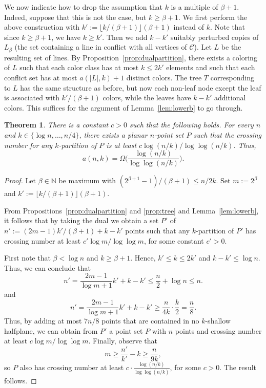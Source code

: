 \documentclass{paper}
\newcommand\N{{\mathbb N}}
\newcommand\eqdef{:=}
\newtheorem {theorem} {Theorem}[section]
\begin{document}
We now indicate how to drop the assumption that $k$ is a multiple
of $\beta + 1$. Indeed, suppose that this is not the case,
but $k \geq \beta + 1$.  We first perform the
above construction with $k' \eqdef \lfloor k/(\beta + 1) \rfloor (\beta + 1)$ 
instead of $k$. Note that since $k \geq \beta+1$, we have $k \geq k'$. 
Then we add $k-k'$ suitably perturbed copies of $L_\beta$ 
(the set containing a line in conflict with all vertices of $\mathcal{C}$).
Let $L$ be the resulting set of lines. By Proposition~\ref{prop:dualpartition},
there exists a coloring of $L$ such that each color class has at most
$k \leq 2k'$ elements and such that each conflict set has at most
$a(|L|, k)+1$ distinct colors. The tree $T$ corresponding to $L$
has the same structure as before, but now each non-leaf node except
the leaf is associated with $k'/(\beta + 1)$ colors, while the leaves
have $k - k'$ additional colors. 
This suffices for the argument of Lemma~\ref{lem:lowerb} to go through.

\begin{theorem}
There is a constant $c > 0$ such that the following holds. For every $n$
and $k \in \{\log n, \ldots, n/4\}$, there 
exists a planar $n$-point set $P$
such that the crossing number for any $k$-partition of $P$ is at least
$c\log (n/k) / \log\log (n/k)$. Thus,
\[a(n,k) = \Omega\Biggl(\frac{\log (n/k)}{\log\log (n/k)}\Biggr).\]
\end{theorem}

\begin{proof}
Let $\beta \in \N$ be maximum with $(2^{\beta+1}-1)/(\beta+1) \leq n/2k$. 
Set $m \eqdef 2^\beta$ and $k' \eqdef \lfloor k/(\beta + 1) \rfloor (\beta + 1)$. 

From Propositions~\ref{prop:dualpartition} and \ref{prop:tree} 
and Lemma~\ref{lem:lowerb}, it follows that by taking the dual
we obtain a set $P'$ of 
$n' \eqdef (2m-1)k'/(\beta +1) + k - k'$ points such that
any $k$-partition of $P'$ has crossing number at least
$c' \log m / \log\log m$, for some constant $c' > 0$.

First note that $\beta < \log n$ and $k \geq \beta + 1$.
Hence, $k' \leq k \leq 2k'$ and $k - k' \leq \log n$. Thus, we can conclude that
\[
n' =  \frac{2m-1}{\log m + 1}k' + k - k' \leq \frac{n}{2} + \log n \leq n.
\]
and
\[
n' =  \frac{2m-1}{\log m + 1}k' + k - k' \geq \frac{n}{4k} \cdot \frac{k}{2} 
  = \frac{n}{8}.
\]
Thus, by adding at most $7n/8$ points that are contained in no $k$-shallow
halfplane, we can obtain from $P'$ a point set $P$ with $n$ points
and crossing number at least $c \log m / \log\log m$.
Finally, observe that 
\[
m \geq \frac{n'}{k'} - k \geq \frac{n}{9k}, 
\]
so $P$ also has crossing number at least
$c \cdot \frac{\log(n/k)}{\log\log(n/k)}$, for some $c > 0$. 
The result follows.
\end{proof}
\end{document}
